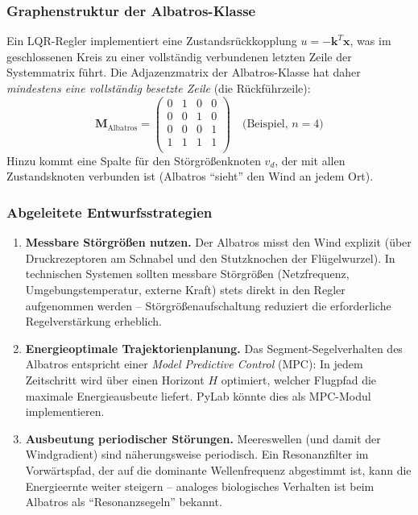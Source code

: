 \documentclass[a4paper,12pt]{article}
\theoremstyle{definition}
\begin{document}
\subsubsection{Graphenstruktur der Albatros-Klasse}

Ein LQR-Regler implementiert eine Zustandsrückkopplung $u = -\mathbf{k}^T \mathbf{x}$,
was im geschlossenen Kreis zu einer vollständig verbundenen letzten Zeile der
Systemmatrix führt. Die Adjazenzmatrix der Albatros-Klasse hat daher
\emph{mindestens eine vollständig besetzte Zeile} (die Rückführzeile):
\[
\mathbf{M}_{\text{Albatros}} =
\begin{pmatrix}
	0      & 1      & 0      & 0      \\
	0      & 0      & 1      & 0      \\
	0      & 0      & 0      & 1      \\
	1      & 1      & 1      & 1      \\
\end{pmatrix}
\quad \text{(Beispiel, } n=4\text{)}
\]
Hinzu kommt eine Spalte für den Störgrößenknoten $v_d$, der mit allen
Zustandsknoten verbunden ist (Albatros ``sieht'' den Wind an jedem Ort).

\subsubsection{Abgeleitete Entwurfsstrategien}

\begin{enumerate}
	\item \textbf{Messbare Störgrößen nutzen.}
	Der Albatros misst den Wind explizit (über Druckrezeptoren am
	Schnabel und den Stutzknochen der Flügelwurzel). In technischen
	Systemen sollten messbare Störgrößen (Netzfrequenz, Umgebungstemperatur,
	externe Kraft) stets direkt in den Regler aufgenommen werden --
	Störgrößenaufschaltung reduziert die erforderliche Regelverstärkung
	erheblich.
	
	\item \textbf{Energieoptimale Trajektorienplanung.}
	Das Segment-Segelverhalten des Albatros entspricht einer
	\emph{Model Predictive Control} (MPC): In jedem Zeitschritt wird
	über einen Horizont $H$ optimiert, welcher Flugpfad die maximale
	Energieausbeute liefert. PyLab könnte dies als MPC-Modul implementieren.
	
	\item \textbf{Ausbeutung periodischer Störungen.}
	Meereswellen (und damit der Windgradient) sind näherungsweise
	periodisch. Ein Resonanzfilter im Vorwärtspfad, der auf die
	dominante Wellenfrequenz abgestimmt ist, kann die
	Energieernte weiter steigern -- analoges biologisches Verhalten
	ist beim Albatros als ``Resonanzsegeln'' bekannt.
\end{enumerate}
\end{document}
